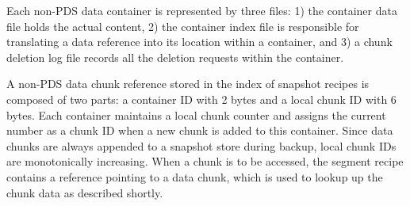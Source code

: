 Each non-PDS data container is represented by three files:
1) the container data file holds the actual content, 
2) the container index file is responsible for translating a data reference
into its location within a container, and 
3) a chunk deletion log file records all the deletion requests within  the container.

A non-PDS data chunk reference stored in the index of snapshot recipes
is composed of two parts: a container ID with 2 bytes and a local chunk ID with 6 bytes.
Each container maintains a local  chunk counter and assigns the current number 
as a chunk ID  when  a new chunk is added to this  container. 
Since data chunks are always appended to a snapshot store during backup, 
local chunk IDs are monotonically increasing.
When a chunk is to be accessed, the segment recipe contains a reference pointing to  a data chunk, which is used to lookup up the chunk data as described shortly.



